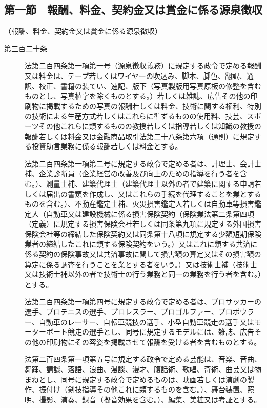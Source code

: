 \documentclass[twocolumn,a4j,10pt]{ltjtarticle}
\begin{document}
\subsection*{第一節　報酬、料金、契約金又は賞金に係る源泉徴収}
\noindent\hspace{10pt}（報酬、料金、契約金又は賞金に係る源泉徴収）
\begin{description}
\item[第三百二十条]法第二百四条第一項第一号（源泉徴収義務）に規定する政令で定める報酬又は料金は、テープ若しくはワイヤーの吹込み、脚本、脚色、翻訳、通訳、校正、書籍の装てい、速記、版下（写真製版用写真原板の修整を含むものとし、写真植字を除くものとする。）若しくは雑誌、広告その他の印刷物に掲載するための写真の報酬若しくは料金、技術に関する権利、特別の技術による生産方式若しくはこれらに準ずるものの使用料、技芸、スポーツその他これらに類するものの教授若しくは指導若しくは知識の教授の報酬若しくは料金又は金融商品取引法第二十八条第六項（通則）に規定する投資助言業務に係る報酬若しくは料金とする。
\item[]法第二百四条第一項第二号に規定する政令で定める者は、計理士、会計士補、企業診断員（企業経営の改善及び向上のための指導を行う者を含む。）、測量士補、建築代理士（建築代理士以外の者で建築に関する申請若しくは届出の書類を作成し、又はこれらの手続を代理することを業とするものを含む。）、不動産鑑定士補、火災損害鑑定人若しくは自動車等損害鑑定人（自動車又は建設機械に係る損害保険契約（保険業法第二条第四項（定義）に規定する損害保険会社若しくは同条第九項に規定する外国損害保険会社等の締結した保険契約又は同条第十八項に規定する少額短期保険業者の締結したこれに類する保険契約をいう。）又はこれに類する共済に係る契約の保険事故又は共済事故に関して損害額の算定又はその損害額の算定に係る調査を行うことを業とする者をいう。）又は技術士補（技術士又は技術士補以外の者で技術士の行う業務と同一の業務を行う者を含む。）とする。
\item[]法第二百四条第一項第四号に規定する政令で定める者は、プロサッカーの選手、プロテニスの選手、プロレスラー、プロゴルファー、プロボウラー、自動車のレーサー、自転車競技の選手、小型自動車競走の選手又はモーターボート競走の選手とし、同号に規定するモデルには、雑誌、広告その他の印刷物にその容姿を掲載させて報酬を受ける者を含むものとする。
\item[]法第二百四条第一項第五号に規定する政令で定める芸能は、音楽、音曲、舞踊、講談、落語、浪曲、漫談、漫才、腹話術、歌唱、奇術、曲芸又は物まねとし、同号に規定する政令で定めるものは、映画若しくは演劇の製作、振付け（剣技指導その他これに類するものを含む。）、舞台装置、照明、撮影、演奏、録音（擬音効果を含む。）、編集、美粧又は考証とする。

\end{description}
\end{document}
